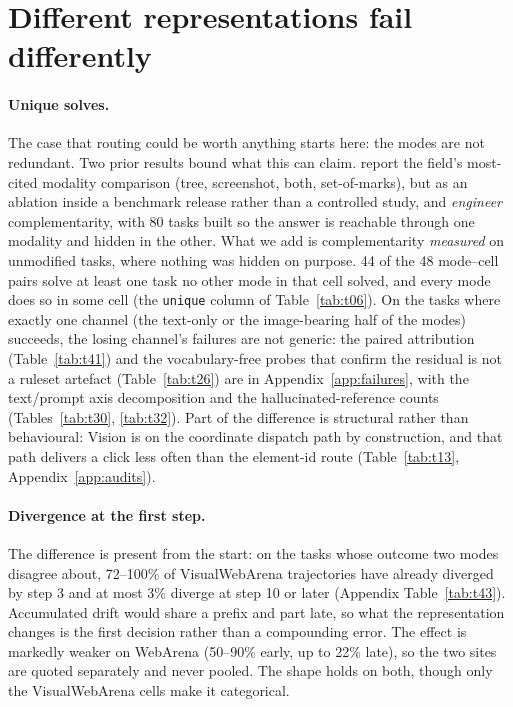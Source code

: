 \section{Different representations fail differently}\label{sec:complementarity}

 \paragraph{Unique solves.} The case that routing could be worth anything starts here: the modes are not redundant. Two prior results bound what this can claim. \citet{xie2024osworld} report the field's most-cited modality comparison (tree, screenshot, both, set-of-marks), but as an ablation inside a benchmark release rather than a controlled study, and \citet{levy2026stwebagentbench} \emph{engineer} complementarity, with 80 tasks built so the answer is reachable through one modality and hidden in the other. What we add is complementarity \emph{measured} on unmodified tasks, where nothing was hidden on purpose. 44 of the 48 mode--cell pairs solve at least one task no other mode in that cell solved, and every mode does so in some cell (the \texttt{unique} column of Table~\ref{tab:t06}). On the tasks where exactly one channel (the text-only or the image-bearing half of the modes) succeeds, the losing channel's failures are not generic: the paired attribution (Table~\ref{tab:t41}) and the vocabulary-free probes that confirm the residual is not a ruleset artefact (Table~\ref{tab:t26}) are in Appendix~\ref{app:failures}, with the text/prompt axis decomposition and the hallucinated-reference counts (Tables~\ref{tab:t30}, \ref{tab:t32}). Part of the difference is structural rather than behavioural: Vision is on the coordinate dispatch path by construction, and that path delivers a click less often than the element-id route (Table~\ref{tab:t13}, Appendix~\ref{app:audits}).

 \paragraph{Divergence at the first step.} The difference is present from the start: on the tasks whose outcome two modes disagree about, 72--100\% of VisualWebArena trajectories have already diverged by step 3 and at most 3\% diverge at step 10 or later (Appendix Table~\ref{tab:t43}). Accumulated drift would share a prefix and part late, so what the representation changes is the first decision rather than a compounding error. The effect is markedly weaker on WebArena (50--90\% early, up to 22\% late), so the two sites are quoted separately and never pooled. The shape holds on both, though only the VisualWebArena cells make it categorical.

